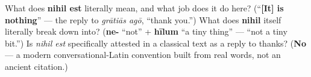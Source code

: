 \begin{tcolorbox}[breakable,colback=teal!4,colframe=teal!35!black,title={Before you move on}]
What does \textbf{nihil est} literally mean, and what job does it do here? (\textquotedblleft{}\textbf{{[}It{]} is nothing}\textquotedblright{} — the reply to \emph{grātiās agō}, \textquotedblleft{}thank you.\textquotedblright{}) What does \textbf{nihil} itself literally break down into? (\textbf{ne-} \textquotedblleft{}not\textquotedblright{} + \textbf{hīlum} \textquotedblleft{}a tiny thing\textquotedblright{} — \textquotedblleft{}not a tiny bit.\textquotedblright{}) Is \emph{nihil est} specifically attested in a classical text as a reply to thanks? (\textbf{No} — a modern conversational-Latin convention built from real words, not an ancient citation.)
\end{tcolorbox}
